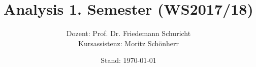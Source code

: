 \documentclass[11pt, oneside]{book}
\theoremstyle{break}
\theoremstyle{break}
\begin{document}
\title{\textbf{Analysis 1. Semester (WS2017/18)}}
\author{Dozent: Prof. Dr. Friedemann Schuricht\\
	Kursassistenz: Moritz Schönherr}
\date{Stand: \today}

\frontmatter
\maketitle
\tableofcontents

\mainmatter








%
%
%
%
%

\backmatter
\end{document}
